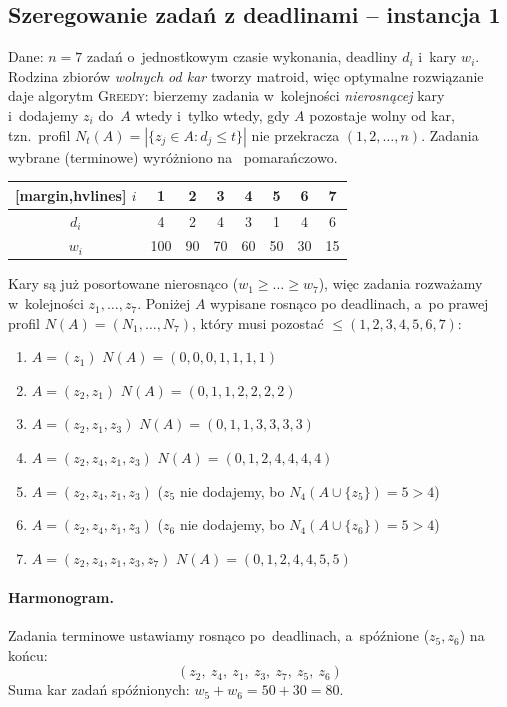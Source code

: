 \subsection{Szeregowanie zadań z deadlinami -- instancja 1}

Dane: $n = 7$ zadań o~jednostkowym czasie wykonania, deadliny $d_i$ i~kary
$w_i$. Rodzina zbiorów \emph{wolnych od kar} tworzy matroid, więc optymalne
rozwiązanie daje algorytm \textsc{Greedy}: bierzemy zadania w~kolejności
\emph{nierosnącej} kary i~dodajemy $z_i$ do~$A$ wtedy i~tylko wtedy, gdy $A$
pozostaje wolny od kar, tzn.\ profil $N_t(A) = |\{z_j \in A : d_j \leq t\}|$
nie przekracza $(1, 2, \ldots, n)$. Zadania wybrane (terminowe) wyróżniono na~%
\textcolor{accentB}{pomarańczowo}.

\begin{aztable}
	\centering
	\renewcommand{\arraystretch}{1.2}
	\begin{NiceTabular}{c|ccccccc}[margin,hvlines]
		$i$   & \color{accentB}1 & \color{accentB}2 & \color{accentB}3 & \color{accentB}4 & 5 & 6 & \color{accentB}7  \\
		\hline
		$d_i$ & \color{accentB}4 & \color{accentB}2 & \color{accentB}4 & \color{accentB}3 & 1 & 4 & \color{accentB}6  \\
		$w_i$ & \color{accentB}100 & \color{accentB}90 & \color{accentB}70 & \color{accentB}60 & 50 & 30 & \color{accentB}15
	\end{NiceTabular}
\end{aztable}

\begin{dygresja}
	Kary są już posortowane nierosnąco ($w_1 \geq \dots \geq w_7$), więc zadania
	rozważamy w~kolejności $z_1, \dots, z_7$. Poniżej $A$ wypisane rosnąco po
	deadlinach, a~po prawej profil $N(A) = (N_1, \ldots, N_7)$, który musi
	pozostać $\leq (1, 2, 3, 4, 5, 6, 7)$:
	\begin{enumerate}[nosep]
		\item $A = (z_1)$ \hfill $N(A) = (0, 0, 0, 1, 1, 1, 1)$
		\item $A = (z_2, z_1)$ \hfill $N(A) = (0, 1, 1, 2, 2, 2, 2)$
		\item $A = (z_2, z_1, z_3)$ \hfill $N(A) = (0, 1, 1, 3, 3, 3, 3)$
		\item $A = (z_2, z_4, z_1, z_3)$ \hfill $N(A) = (0, 1, 2, 4, 4, 4, 4)$
		\item $A = (z_2, z_4, z_1, z_3)$ \quad ($z_5$ nie dodajemy, bo $N_4(A \cup \{z_5\}) = 5 > 4$)
		\item $A = (z_2, z_4, z_1, z_3)$ \quad ($z_6$ nie dodajemy, bo $N_4(A \cup \{z_6\}) = 5 > 4$)
		\item $A = (z_2, z_4, z_1, z_3, z_7)$ \hfill $N(A) = (0, 1, 2, 4, 4, 5, 5)$
	\end{enumerate}
\end{dygresja}

\paragraph{Harmonogram.}
Zadania terminowe ustawiamy rosnąco po~deadlinach, a~spóźnione ($z_5, z_6$) na
końcu:
\[
	\boxed{(z_2,\ z_4,\ z_1,\ z_3,\ z_7,\ z_5,\ z_6)}
\]
Suma kar zadań spóźnionych: $w_5 + w_6 = 50 + 30 = 80$.
